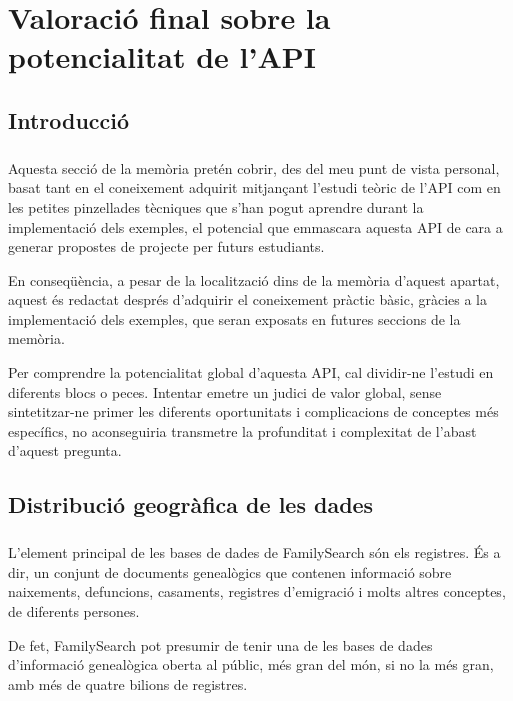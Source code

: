 \chapter{Valoració final sobre la potencialitat de l'API}

\section{Introducció}

    \paragraph{}
    Aquesta secció de la memòria pretén cobrir, des del meu punt de vista personal, basat tant en el coneixement adquirit mitjançant l'estudi teòric de l'API com en les petites pinzellades tècniques que s'han pogut aprendre durant la implementació dels exemples, el potencial que emmascara aquesta API de cara a generar propostes de projecte per futurs estudiants.

    En conseqüència, a pesar de la localització dins de la memòria d'aquest apartat, aquest és redactat després d'adquirir el coneixement pràctic bàsic, gràcies a la implementació dels exemples, que seran exposats en futures seccions de la memòria.

    Per comprendre la potencialitat global d'aquesta API, cal dividir-ne l'estudi en diferents blocs o peces. Intentar emetre un judici de valor global, sense sintetitzar-ne primer les diferents oportunitats i complicacions de conceptes més específics, no aconseguiria transmetre la profunditat i complexitat de l'abast d'aquest pregunta.

\section{Distribució geogràfica de les dades}

    \paragraph{}
    L'element principal de les bases de dades de FamilySearch són els registres. És a dir, un conjunt de documents genealògics que contenen informació sobre naixements, defuncions, casaments, registres d'emigració i molts altres conceptes, de diferents persones.

    De fet, FamilySearch pot presumir de tenir una de les bases de dades d'informació genealògica oberta al públic, més gran del món, si no la més gran, amb més de quatre bilions de registres.

